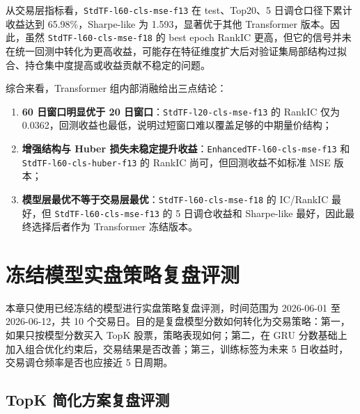 \documentclass[12pt,a4paper,cn,bibtex]{elegantpaper}
\newcommand{\modelname}[1]{\nolinkurl{#1}}
\begin{document}
从交易层指标看，\modelname{StdTF-l60-cls-mse-f13} 在 test、Top20、5 日调仓口径下累计收益达到 65.98\%，Sharpe-like 为 1.593，显著优于其他 Transformer 版本。因此，虽然 \modelname{StdTF-l60-cls-mse-f18} 的 best epoch RankIC 更高，但它的信号并未在统一回测中转化为更高收益，可能存在特征维度扩大后对验证集局部结构过拟合、持仓集中度提高或收益贡献不稳定的问题。

综合来看，Transformer 组内部消融给出三点结论：
\begin{enumerate}[label=\arabic*)]
    \item \textbf{60 日窗口明显优于 20 日窗口}：\modelname{StdTF-l20-cls-mse-f13} 的 RankIC 仅为 0.0362，回测收益也最低，说明过短窗口难以覆盖足够的中期量价结构；
    \item \textbf{增强结构与 Huber 损失未稳定提升收益}：\modelname{EnhancedTF-l60-cls-mse-f13} 和 \modelname{StdTF-l60-cls-huber-f13} 的 RankIC 尚可，但回测收益不如标准 MSE 版本；
    \item \textbf{模型层最优不等于交易层最优}：\modelname{StdTF-l60-cls-mse-f18} 的 IC/RankIC 最好，但 \modelname{StdTF-l60-cls-mse-f13} 的 5 日调仓收益和 Sharpe-like 最好，因此最终选择后者作为 Transformer 冻结版本。
\end{enumerate}

\section{冻结模型实盘策略复盘评测}

本章只使用已经冻结的模型进行实盘策略复盘评测，时间范围为 2026-06-01 至 2026-06-12，共 10 个交易日。目的是复盘模型分数如何转化为交易策略：第一，如果只按模型分数买入 TopK 股票，策略表现如何；第二，在 GRU 分数基础上加入组合优化约束后，交易结果是否改善；第三，训练标签为未来 5 日收益时，交易调仓频率是否也应接近 5 日周期。

\subsection{TopK 简化方案复盘评测}
\end{document}
